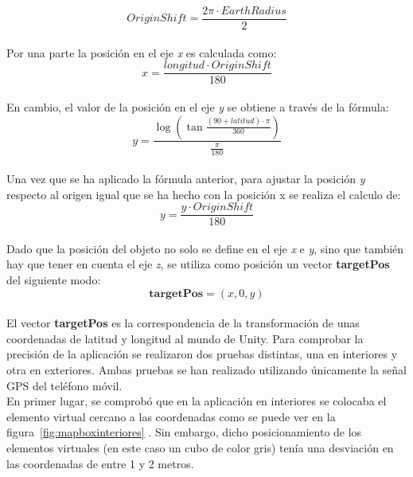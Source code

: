 \[OriginShift = \frac{2\pi\cdot EarthRadius}{2}\]\\

Por una parte la posición en el eje \textit{x} es calculada como:\\

\[x = \frac{longitud\cdot OriginShift}{180}\]\\

En cambio, el valor de la posición en el eje \textit{y} se obtiene a través de la fórmula:\\

\[y = \frac{\log(\tan\frac{(90+latitud)\cdot\pi}{360})}{\frac{\pi}{180}}\]\\

Una vez que se ha aplicado la fórmula anterior, para ajustar la posición \textit{y} respecto al origen igual que se ha hecho con la posición x se realiza el calculo de:\\

\[y = \frac{y \cdot OriginShift}{180}\]\\

Dado que la posición del objeto no solo se define en el eje \textit{x} e \textit{y}, sino que también hay que tener en cuenta el eje \textit{z}, se utiliza como posición un vector \textbf{targetPos} del siguiente modo:\\

\[\textbf{targetPos} = (x,0,y)\]\\

El vector \textbf{targetPos} es la correspondencia de la transformación de unas coordenadas de latitud y longitud al mundo de Unity. Para comprobar la precisión de la aplicación se realizaron dos pruebas distintas, una en interiores y otra en exteriores. Ambas pruebas se han realizado utilizando únicamente la señal GPS del teléfono móvil.\\

En primer lugar, se comprobó que en la aplicación en interiores se colocaba el elemento virtual cercano a las coordenadas como se puede ver en la figura~\ref{fig:mapboxinteriores} . Sin embargo, dicho posicionamiento de los elementos virtuales (en este caso un cubo de color gris) tenía una desviación en las coordenadas de entre 1 y 2 metros.

